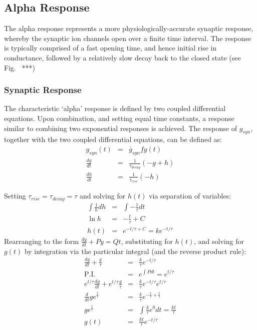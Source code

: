 \documentclass[12pt]{article}
\begin{document}
\subsection{Alpha Response}
The alpha response represents a more physiologically-accurate synaptic response,
whereby the synaptic ion channels open over a finite time interval. The
response is typically comprised of a fast opening time, and hence initial rise
in conductance, followed by a relatively slow decay back to the closed state (see
Fig.~ ***)

\subsubsection*{Synaptic Response}
The characteristic `alpha' response is defined by two coupled differential
equations.  Upon combination, and setting equal time constants, a response
similar to combining two exponential responses is achieved. The response of
$g_{syn}$, together with the two coupled differential equations, can be defined
as:
\begin{eqnarray}
g_{syn}(t) & = & \bar{g}_{syn}fg(t) \nonumber \\
\frac{dg}{dt} & = & \frac{1}{\tau_{decay}} (-g + h) \nonumber \\
\frac{dh}{dt} & = & \frac{1}{\tau_{rise}}(-h) \nonumber
\label{eqn:alpha_coupled_diff_eqns}
\end{eqnarray}

Setting $\tau_{rise}=\tau_{decay} = \tau$ and solving for $h(t)$ via separation
of variables:
\begin{eqnarray}
\int \frac{1}{h} dh & = & \int -\frac{1}{\tau}dt \nonumber \\
\ln{h}&=&-\frac{t}{\tau} + C \nonumber \\
h(t) & = & e^{-{t/\tau}+C} = ke^{-t / \tau} \nonumber
\label{eqn:solve_for_h}
\end{eqnarray}
Rearranging to the form $\frac{dy}{dt} +Py = Qt$, substituting  for $h(t)$, and
solving for $g(t)$ by integration via the particular integral (and the reverse
product rule):
\begin{eqnarray}
\frac{dg}{dt} + \frac{g}{\tau}&=&\frac{k}{\tau}e^{-t/\tau} \nonumber\\
\mathrm{P.I.}&=& e^{\int P dt} = e^{t/ \tau} \nonumber \\
e^{t/\tau}\frac{dg}{dt} + e^{t/\tau}\frac{g}{\tau}
&=& \frac{k}{\tau}e^{-t/\tau}e^{t/\tau} \nonumber \\
\frac{d}{dt} g e^{\frac{t}{\tau}}&=&\frac{k}{\tau}e^{-\frac{t}{\tau}
+\frac{t}{\tau}} \nonumber \\
g e^{\frac{t}{\tau}} &=& \int \frac{k}{\tau}e^0 dt  =  \frac{kt}{\tau} \nonumber \\
g(t)&=&\frac{kt}{\tau}e^{-t/\tau}
\end{eqnarray}
\end{document}
